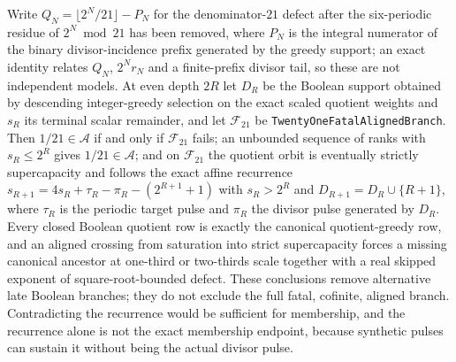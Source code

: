 \begin{thm}
Write $Q_N=\lfloor2^N/21\rfloor-P_N$ for the denominator-$21$ defect after the
six-periodic residue of $2^N\bmod21$ has been removed, where $P_N$ is the
integral numerator of the binary divisor-incidence prefix generated by the
greedy support; an exact identity relates $Q_N$, $2^Nr_N$ and a finite-prefix
divisor tail, so these are not independent models.  At even depth $2R$ let
$D_R$ be the Boolean support obtained by descending integer-greedy selection
on the exact scaled quotient weights and $s_R$ its terminal scalar remainder,
and let $\mathcal F_{21}$ be \texttt{TwentyOneFatalAlignedBranch}.  Then
$1/21\in\mathcal A$ if and only if $\mathcal F_{21}$ fails; an unbounded
sequence of ranks with $s_R\le2^R$ gives $1/21\in\mathcal A$; and on
$\mathcal F_{21}$ the quotient orbit is eventually strictly supercapacity and
follows the exact affine recurrence
$s_{R+1}=4s_R+\tau_R-\pi_R-(2^{R+1}+1)$ with $s_R>2^R$ and
$D_{R+1}=D_R\cup\{R+1\}$, where $\tau_R$ is the periodic target pulse and
$\pi_R$ the divisor pulse generated by $D_R$.  Every closed Boolean quotient
row is exactly the canonical quotient-greedy row, and an aligned crossing
from saturation into strict supercapacity forces a missing canonical ancestor
at one-third or two-thirds scale together with a real skipped exponent of
square-root-bounded defect.  These conclusions remove alternative late
Boolean branches; they do not exclude the full fatal, cofinite, aligned
branch.  Contradicting the recurrence would be sufficient for membership, and
the recurrence alone is not the exact membership endpoint, because synthetic
pulses can sustain it without being the actual divisor pulse.
\par\noindent{}  
\end{thm}

